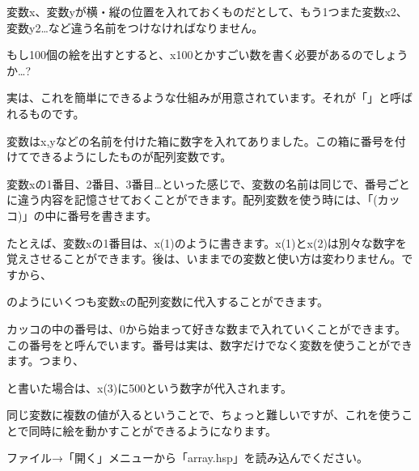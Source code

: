 変数x、変数yが横・縦の位置を入れておくものだとして、もう1つまた変数x2、変数y2…など違う名前をつけなければなりません。

もし100個の絵を出すとすると、x100とかすごい数を書く必要があるのでしょうか…?


実は、これを簡単にできるような仕組みが用意されています。それが「」と呼ばれるものです。

変数はx,yなどの名前を付けた箱に数字を入れてありました。この箱に番号を付けてできるようにしたものが配列変数です。

変数xの1番目、2番目、3番目…といった感じで、変数の名前は同じで、番号ごとに違う内容を記憶させておくことができます。配列変数を使う時には、「(カッコ)」の中に番号を書きます。


\begin{description}
    \item {}
\end{description}

たとえば、変数xの1番目は、x(1)のように書きます。x(1)とx(2)は別々な数字を覚えさせることができます。後は、いままでの変数と使い方は変わりません。ですから、



\begin{description}
    \item {}
    \item {}
    \item {}
\end{description}


のようにいくつも変数xの配列変数に代入することができます。

カッコの中の番号は、0から始まって好きな数まで入れていくことができます。この番号をと呼んでいます。番号は実は、数字だけでなく変数を使うことができます。つまり、

\begin{description}
    \item {}
    \item {}
\end{description}

と書いた場合は、x(3)に500という数字が代入されます。

同じ変数に複数の値が入るということで、ちょっと難しいですが、これを使うことで同時に絵を動かすことができるようになります。

ファイル→「開く」メニューから「array.hsp」を読み込んでください。

